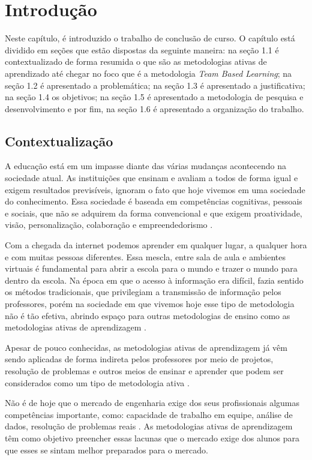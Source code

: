 \chapter[Introdução]{Introdução}

Neste capítulo, é introduzido o trabalho de conclusão de curso. O capítulo está dividido em seções que estão dispostas da seguinte maneira: na seção 1.1 é contextualizado de forma resumida o que são as metodologias ativas de aprendizado até chegar no foco que é a metodologia \textit{Team Based Learning}; na seção 1.2 é apresentado a problemática; na seção 1.3 é apresentado a justificativa; na seção 1.4 os objetivos; na seção 1.5 é apresentado a metodologia de pesquisa e desenvolvimento e por fim, na seção 1.6 é apresentado a organização do trabalho.


\section{Contextualização}

A educação está em um impasse diante das várias mudanças acontecendo na sociedade atual. As instituições que ensinam e avaliam a todos de forma igual e exigem resultados previsíveis, ignoram o fato que hoje vivemos em uma sociedade do conhecimento. Essa sociedade é baseada em competências cognitivas, pessoais e sociais, que não se adquirem da forma convencional e que exigem proatividade, visão, personalização, colaboração e empreendedorismo \cite{moran}.

Com a chegada da internet podemos aprender em qualquer lugar, a qualquer hora e com muitas pessoas diferentes. Essa mescla, entre sala de aula e ambientes virtuais é fundamental para abrir a escola para o mundo e trazer o mundo para dentro da escola. Na época em que o acesso à informação era difícil, fazia sentido os métodos tradicionais, que privilegiam a transmissão de informação pelos professores, porém na sociedade em que vivemos hoje esse tipo de metodologia não é tão efetiva, abrindo espaço para outras metodologias de ensino como as metodologias ativas de aprendizagem \cite{moran}.

Apesar de pouco conhecidas, as metodologias ativas de aprendizagem já vêm sendo aplicadas de forma indireta pelos professores por meio de projetos, resolução de problemas e outros meios de ensinar e aprender que podem ser considerados como um tipo de metodologia ativa \cite{moran}.

Não é de hoje que o mercado de engenharia exige dos seus profissionais algumas competências importante, como: capacidade de trabalho em equipe, análise de dados, resolução de problemas reais \cite{davis}. As metodologias ativas de aprendizagem têm como objetivo preencher essas lacunas que o mercado exige dos alunos para que esses se sintam melhor preparados para o mercado.

